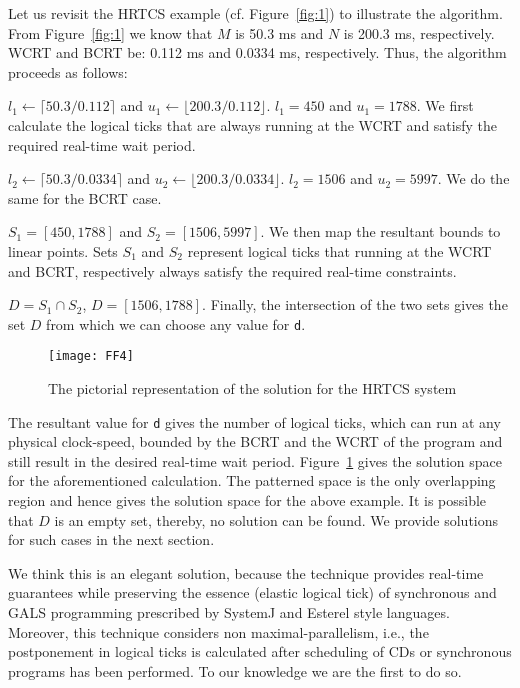 Let us revisit the HRTCS example (cf. Figure~\ref{fig:1}) to illustrate
the algorithm. From Figure~\ref{fig:1} we know that $M$ is 50.3 ms and
$N$ is 200.3 ms, respectively.  WCRT and BCRT be: 0.112 ms and 0.0334 ms, respectively. Thus, the
algorithm proceeds as follows:

\begin{enumerate*}
\item $l_1 \leftarrow \lceil 50.3/0.112 \rceil$ and $u_1 \leftarrow
  \lfloor 200.3/0.112 \rfloor$. $l_1 = 450$ and $u_1 = 1788$. We first
  calculate the logical ticks that are always running at the WCRT and
  satisfy the required real-time wait period.
\item $l_2 \leftarrow \lceil 50.3/0.0334 \rceil$ and $u_2 \leftarrow
  \lfloor 200.3/0.0334 \rfloor$. $l_2 = 1506$ and $u_2 = 5997$. We do
  the same for the BCRT case.
\item $S_1 = [450,1788]$ and $S_2 =[1506,5997]$. We then map the
  resultant bounds to linear points. Sets $S_1$ and $S_2$ represent
  logical ticks that running at the WCRT and BCRT, respectively always
  satisfy the required real-time constraints.
\item $D = S_1 \cap S_2$, $D = [1506,1788]$. Finally, the intersection
  of the two sets gives the set $D$ from which we can choose any value
  for \texttt{d}.
\end{enumerate*}

\begin{figure}[t!]
  \centering
  \texttt{[image: FF4]}
  \caption{The pictorial representation of the solution for the HRTCS system}
  \label{fig:hrtcssoln}
\end{figure}

The resultant value for \texttt{d} gives the number of logical ticks,
which can run at any physical clock-speed, bounded by the BCRT and the
WCRT of the program and still result in the desired real-time wait
period. Figure~\ref{fig:hrtcssoln} gives the solution space for the
aforementioned calculation. The patterned space is the only overlapping
region and hence gives the solution space for the above example. It is
possible that $D$ is an empty set, thereby, no solution can be found. We
provide solutions for such cases in the next section.

We think this is an elegant solution, because the technique provides
real-time guarantees while preserving the essence (elastic logical tick)
of synchronous and GALS programming prescribed by SystemJ and Esterel
style languages. Moreover, this technique considers non
maximal-parallelism, i.e., the postponement in logical ticks is
calculated after scheduling of CDs or synchronous programs has been
performed. To our knowledge we are the first to do so.

